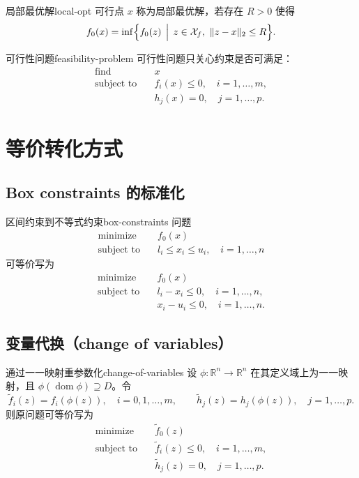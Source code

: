 \documentclass[11pt,a4paper]{article}
\begin{document}
\begin{definition}{局部最优解}{local-opt}
可行点 $x$ 称为局部最优解，若存在 $R>0$ 使得
\[
f_0(x)=\inf\Bigl\{f_0(z)\,\Bigm|\,z\in\mathcal X_f,\ \|z-x\|_2\le R\Bigr\}.
\]
\end{definition}

\begin{definition}{可行性问题}{feasibility-problem}
可行性问题只关心约束是否可满足：
\[
\begin{aligned}
\text{find}\quad & x\\
\text{subject to}\quad & f_i(x)\le0,\quad i=1,\dots,m,\\
& h_j(x)=0,\quad j=1,\dots,p.
\end{aligned}
\]
\end{definition}

\section{等价转化方式}\label{sec:ch4-transform}

\subsection{Box constraints 的标准化}
\begin{example}{区间约束到不等式约束}{box-constraints}
问题
\[
\begin{aligned}
\text{minimize}\quad & f_0(x)\\
\text{subject to}\quad & l_i\le x_i\le u_i,\quad i=1,\dots,n
\end{aligned}
\]
可等价写为
\[
\begin{aligned}
\text{minimize}\quad & f_0(x)\\
\text{subject to}\quad & l_i-x_i\le0,\quad i=1,\dots,n,\\
& x_i-u_i\le0,\quad i=1,\dots,n.
\end{aligned}
\]
\end{example}

\subsection{变量代换（change of variables）}
\begin{definition}{通过一一映射重参数化}{change-of-variables}
设 $\phi:\mathbb R^n\to\mathbb R^n$ 在其定义域上为一一映射，且 $\phi(\operatorname{dom}\phi)\supseteq D$。令
\[
\tilde f_i(z)=f_i(\phi(z)),\quad i=0,1,\dots,m,\qquad
\tilde h_j(z)=h_j(\phi(z)),\quad j=1,\dots,p.
\]
则原问题可等价写为
\[
\begin{aligned}
\text{minimize}\quad & \tilde f_0(z)\\
\text{subject to}\quad & \tilde f_i(z)\le0,\quad i=1,\dots,m,\\
& \tilde h_j(z)=0,\quad j=1,\dots,p.
\end{aligned}
\]
\end{definition}
\end{document}
